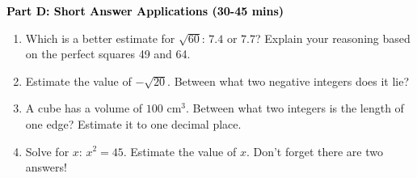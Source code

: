 \documentclass[12pt, letterpaper, fleqn]{article}
\begin{document}
\newpage

\begin{tcolorbox}[colback=customteal!20]
\large\textcolor{black}{\textbf{Part D: Short Answer Applications (30-45 mins)}}
\end{tcolorbox}

\vspace{3mm}

\begin{enumerate}[itemsep=4.2cm, leftmargin=0.6cm, resume]
\item Which is a better estimate for $\sqrt{60}$: $7.4$ or $7.7$? Explain your reasoning based on the perfect squares 49 and 64.
\item Estimate the value of $-\sqrt{20}$. Between what two negative integers does it lie?
\item A cube has a volume of $100\text{ cm}^3$. Between what two integers is the length of one edge? Estimate it to one decimal place.
\item Solve for $x$: $x^2 = 45$. Estimate the value of $x$. Don't forget there are two answers!
\end{enumerate}
\end{document}
